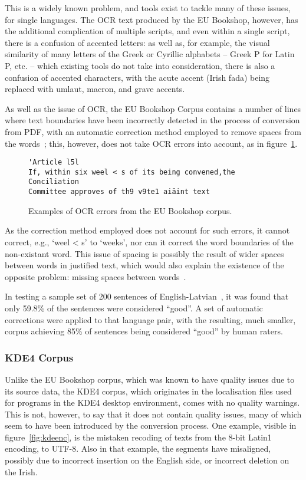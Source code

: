This is a widely known problem, and tools exist to tackle many of these issues, for single languages. The OCR text produced 
by the EU Bookshop, however, has the additional complication of multiple scripts, and even within a single script, there
is a confusion of accented letters: as well as, for example, the visual similarity of many letters of the Greek or Cyrillic
alphabets -- Greek Ρ for Latin P, etc. -- which existing tools do not take into consideration, there is also a confusion
of accented characters, with the acute accent (Irish fada) being replaced with umlaut, macron, and grave accents.

As well as the issue of OCR, the EU Bookshop Corpus contains a number of lines where text boundaries have been incorrectly 
detected in the process of conversion from PDF, with an automatic correction method employed to remove spaces from the
words~\citep[p. 1851]{SkadinsEA:LREC14}; this, however, does not take OCR errors into account, as in figure~\ref{fig:ocreubkshp}.

\begin{figure}
\begin{verbatim}
'Article l5l
If, within six weel < s of its being convened,the Conciliation 
Committee approves of th9 v9te1 aiäint text
\end{verbatim}
\label{fig:ocreubkshp}
\caption{Examples of OCR errors from the EU Bookshop corpus.}
\end{figure}

As the correction method employed does not account for such errors, it cannot
correct, e.g., `weel < s' to `weeks', nor can it correct the word boundaries of
the non-existant word. This issue of spacing is possibly the result
of wider spaces between words in justified text, which would also explain the existence of the opposite problem: missing
spaces between words~\citep[p. 1853]{SkadinsEA:LREC14}.

In testing a sample set of 200 sentences of English-Latvian~\citep[pp. 1852--1853]{SkadinsEA:LREC14}, it was found that
only 59.8\% of the sentences were considered ``good''. A set of automatic corrections were applied to that language
pair, with the resulting, much smaller, corpus achieving 85\% of sentences being considered ``good'' by human raters.

\subsubsection{KDE4 Corpus}

Unlike the EU Bookshop corpus, which was known to have quality issues due to its source data, the KDE4 corpus, which
originates in the localisation files used for programs in the KDE4 desktop environment, comes with no quality warnings.
This is not, however, to say that it does not contain quality issues, many of which seem to have been introduced by the 
conversion process. One example, visible in figure~\ref{fig:kdeenc}, is the mistaken recoding of texts from the 8-bit 
Latin1 encoding, to UTF-8. Also in that example, the segments have misaligned, possibly due to incorrect insertion on
the English side, or incorrect deletion on the Irish.


